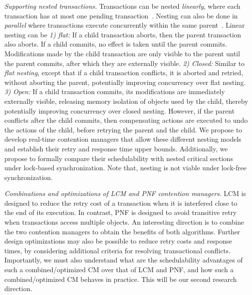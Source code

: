 \documentclass[12pt,english]{report}
\begin{document}
\textit{Supporting nested transactions.} Transactions can be nested \textit{linearly}, where each transaction has at most one pending transaction~\cite{Moss2006186}. Nesting can also be done in \textit{parallel} where transactions execute concurrently within the same parent~\cite{volos2009nepaltm}. Linear nesting can be \textit{1) flat:} If a child transaction aborts, then the parent transaction also aborts. If a child commits, no effect is taken until the parent commits. Modifications made by the child transaction are only visible to the parent until the parent commits, after which they are externally visible. 
%
\textit{2) Closed:} Similar to \textit{flat nesting}, except that if a child transaction conflicts, it is aborted and retried, without aborting the parent, potentially improving concurrency over flat nesting. 
%
\textit{3) Open:} If a child transaction commits, its modifications are immediately externally visible, releasing memory isolation  of objects used by the child, thereby potentially improving concurrency over closed nesting. However, if the parent conflicts after the child commits, then compensating actions are executed to undo the actions of the child, before retrying the parent and the child. 
We propose to develop real-time contention managers that allow these different nesting models and establish their retry and response time upper bounds. Additionally, we propose to formally compare their schedulability with nested critical sections under lock-based synchronization. Note that, nesting is not viable under lock-free synchronization. 


\textit{Combinations and optimizations of LCM and PNF contention managers.} LCM is designed to reduce the retry cost of a transaction when it is interfered close to the end of its execution. In contrast, PNF is designed to avoid transitive retry when transactions access multiple objects. An interesting direction is to combine the two contention managers to obtain the benefits of both algorithms. Further design optimizations may also be possible to reduce retry costs and response times, by considering additional criteria for resolving transactional conflicts. Importantly, we must also understand what are the schedulability advantages of such a combined/optimized CM over that of LCM and PNF, and how such a combined/optimized CM behaves in practice. This will be our second research direction. 
\end{document}
